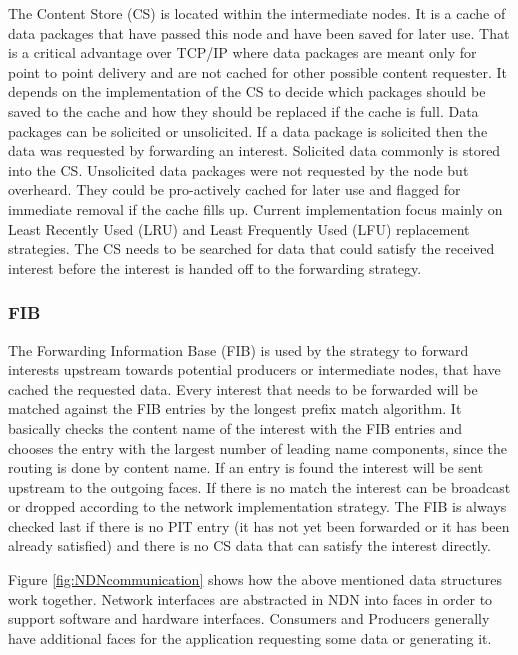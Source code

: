 The Content Store (CS) is located within the intermediate nodes. It is a cache of data packages that have passed this node and have been saved for later use. That is a critical advantage over TCP/IP where data packages are meant only for point to point delivery and are not cached for other possible content requester. It depends on the implementation of the CS to decide which packages should be saved to the cache and how they should be replaced if the cache is full. Data packages can be solicited or unsolicited. If a data package is solicited then the data was requested by forwarding an interest. Solicited data commonly is stored into the CS. Unsolicited data packages were not requested by the node but overheard. They could be pro-actively cached for later use and flagged for immediate removal if the cache fills up. Current implementation focus mainly on Least Recently Used (LRU) and Least Frequently Used (LFU) replacement strategies. The CS needs to be searched for data that could satisfy the received interest before the interest is handed off to the forwarding strategy.

\subsubsection{FIB}

The Forwarding Information Base (FIB) is used by the strategy to forward interests upstream towards potential producers or intermediate nodes, that have cached the requested data. Every interest that needs to be forwarded will be matched against the FIB entries by the longest prefix match algorithm. It basically checks the content name of the interest with the FIB entries and chooses the entry with the largest number of leading name components, since the routing is done by content name. If an entry is found the interest will be sent upstream to the outgoing faces. If there is no match the interest can be broadcast or dropped according to the network implementation strategy. The FIB is always checked last if there is no PIT entry (it has not yet been forwarded or it has been already satisfied) and there is no CS data that can satisfy the interest directly.

Figure \ref{fig:NDNcommunication} shows how the above mentioned data structures work together. Network interfaces are abstracted in NDN into faces in order to support software and hardware interfaces. Consumers and Producers generally have additional faces for the application requesting some data or generating it.

